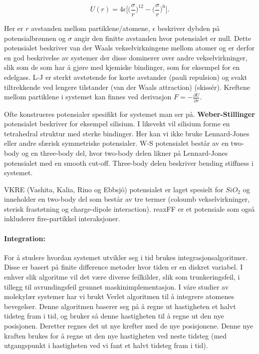 \documentclass[a4paper,10pt]{article}
\newcommand{\p}{\partial}
\begin{document}
\begin{equation}
 U(r) = 4\epsilon\bigg[\bigg(\frac{\sigma}{r}\bigg)^{12}-\bigg(\frac{\sigma}{r}\bigg)^{6}\bigg].
\end{equation}

Her er $r$ avstanden mellom partiklene/atomene, $\epsilon$ beskriver dybden på potensialbrønnen og $\sigma$ angir den finitte avstanden hvor potensialet er null. Dette potensialet beskriver van der Waals vekselvirkningene mellom atomer og er derfor en god beskrivelse av systemer der disse dominerer over andre vekselvirkninger, slik som de som har å gjøre med kjemiske bindinger, som for eksempel for en edelgass. L-J er sterkt avstøtende for korte avstander (pauli repulsion) og svakt tiltrekkende ved lengere tilstander (van der Waals attraction) (skissér). Kreftene mellom partiklene i systemet kan finnes ved derivasjon $F = -\frac{\p U}{\p r}$. 

Ofte konstrueres potensialer spesifikt for systemet man ser på. \textbf{Weber-Stillinger} potensialet beskriver for eksempel silisium. I likevekt vil silisium forme en tetrahedral struktur med sterke bindinger. Her kan vi ikke bruke Lennard-Jones eller andre sfærisk symmetriske potensialer. W-S potensialet består av en two-body og en three-body del, hvor two-body delen likner på Lennard-Jones potensialet med en smooth cut-off. Three-body delen beskriver bending stiffness i systemet. 

VKRE (Vashita, Kalia, Rino og Ebbsjö) potensialet er laget spesielt for $SiO_2$ og inneholder en two-body del som består av tre termer (coloumb vekselvirkninger, sterisk frastøtning og charge-dipole interaction). reaxFF er et potensiale som også inkluderer fire-partikkel interaksjoner. 

\paragraph{Integration:}
For å studere hvordan systemet utvikler seg i tid brukes integrasjonsalgoritmer. Disse er basert på finite difference metoder hvor tiden er en diskret variabel. I enhver slik algoritme vil det være diverse feilkilder, slik som trunkeringsfeil, i tillegg til avrundingsfeil grunnet maskinimplementasjon.
I våre studier av molekylær systemer har vi brukt Verlet algoritmen til å integrere atomenes bevegelser. Denne algoritmen baserer seg på å regne ut hastigheten et halvt tidsteg fram i tid, og bruker så denne hastigheten til å regne ut den nye posisjonen. Deretter regnes det ut nye krefter med de nye posisjonene. Denne nye kraften brukes for å regne ut den nye hastigheten ved neste tidsteg (med utgangspunkt
i hastigheten ved vi fant et halvt tidsteg fram i tid).
\end{document}
